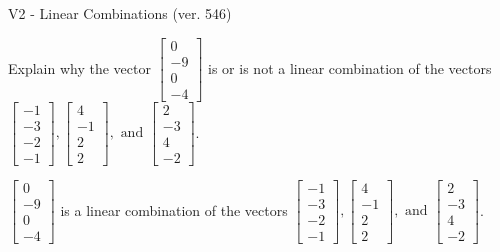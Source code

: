 \begin{exercise}
  \begin{exerciseTitle}V2 - Linear Combinations (ver. 546)\end{exerciseTitle}
  \begin{exerciseStatement}
    Explain why the vector \(\left[\begin{array}{c}
0 \\
-9 \\
0 \\
-4
\end{array}\right]\)  is or is not a linear 
	combination of the vectors \(\left[\begin{array}{c}
-1 \\
-3 \\
-2 \\
-1
\end{array}\right] , \left[\begin{array}{c}
4 \\
-1 \\
2 \\
2
\end{array}\right] , \text{ and } \left[\begin{array}{c}
2 \\
-3 \\
4 \\
-2
\end{array}\right]\).
	


  \end{exerciseStatement}
  \begin{exerciseAnswer}
   \(\left[\begin{array}{c}
0 \\
-9 \\
0 \\
-4
\end{array}\right]\) 
  	 is  
	a linear combination of the vectors \(\left[\begin{array}{c}
-1 \\
-3 \\
-2 \\
-1
\end{array}\right] , \left[\begin{array}{c}
4 \\
-1 \\
2 \\
2
\end{array}\right] , \text{ and } \left[\begin{array}{c}
2 \\
-3 \\
4 \\
-2
\end{array}\right]\).

	
  


  \end{exerciseAnswer}
\end{exercise}